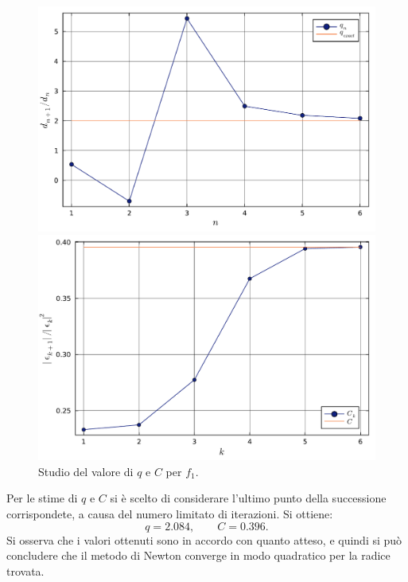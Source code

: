 \documentclass[letterpaper, 12pt]{article}
\begin{document}
\begin{figure}[!ht]
    \centering
    \begin{minipage}[b]{0.47\textwidth}
        \includegraphics[width=\textwidth]{3321_q.pdf}
    \end{minipage}
    \hspace{0.5cm}
    \begin{minipage}[b]{0.47\textwidth}
        \includegraphics[width=\textwidth]{3321_C.pdf}
    \end{minipage}
    \caption{Studio del valore di $q$ e $C$ per $f_1$.}
    \label{fig:es3_3_2_2}
\end{figure}

Per le stime di $q$ e $C$ si è scelto di considerare l'ultimo punto della successione corrispondete, a causa
del numero limitato di iterazioni. Si ottiene:
\begin{equation}
    q = 2.084,
    \qquad
    C = 0.396.
\end{equation}
Si osserva che i valori ottenuti sono in accordo con quanto atteso, e quindi si può concludere che il metodo di
Newton converge in modo quadratico per la radice trovata.
\end{document}
